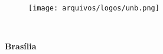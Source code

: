 \begin{titlepage}
\begin{center}

\begin{figure}[h!]
	\centering
		\texttt{[image: arquivos/logos/unb.png]}
	\label{fig:unb}
\end{figure}

{\bf \unb \\
\bf \dep }
\vspace{5cm}

\setcounter{page}{0}
\null
\textbf{\titulo}
\vspace{2.5cm}

\vspace{0.2cm}
\textbf{\autor}
\end{center}
\vspace{1.5cm}

\vspace{5cm}
\begin{center}
{\bf{Brasília} \\ }
\bf{\ano}
\end{center}

\end{titlepage}
